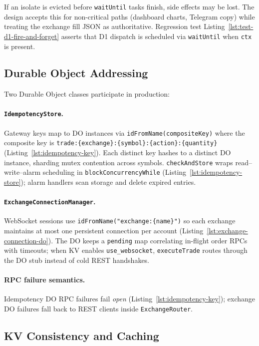 If an isolate is evicted before \texttt{waitUntil} tasks finish, side effects may be lost. The design accepts this for non-critical paths (dashboard charts, Telegram copy) while treating the exchange fill JSON as authoritative. Regression test Listing~\ref{lst:test-d1-fire-and-forget} asserts that D1 dispatch is scheduled via \texttt{waitUntil} when \texttt{ctx} is present.

\subsection{Durable Object Addressing}

Two Durable Object classes participate in production:

\paragraph{\texttt{IdempotencyStore}.} Gateway keys map to DO instances via \texttt{idFromName(compositeKey)} where the composite key is \texttt{trade:\{exchange\}:\{symbol\}:\{action\}:\{quantity\}} (Listing~\ref{lst:idempotency-key}). Each distinct key hashes to a distinct DO instance, sharding mutex contention across symbols. \texttt{checkAndStore} wraps read--write--alarm scheduling in \texttt{blockConcurrencyWhile} (Listing~\ref{lst:idempotency-store}); alarm handlers scan storage and delete expired entries.

\paragraph{\texttt{ExchangeConnectionManager}.} WebSocket sessions use \texttt{idFromName("exchange:\{name\}")} so each exchange maintains at most one persistent connection per account (Listing~\ref{lst:exchange-connection-do}). The DO keeps a \texttt{pending} map correlating in-flight order RPCs with timeouts; when KV enables \texttt{use\_websocket}, \texttt{executeTrade} routes through the DO stub instead of cold REST handshakes.

\paragraph{RPC failure semantics.} Idempotency DO RPC failures fail \emph{open} (Listing~\ref{lst:idempotency-key}); exchange DO failures fall back to REST clients inside \texttt{ExchangeRouter}.

\subsection{KV Consistency and Caching}

